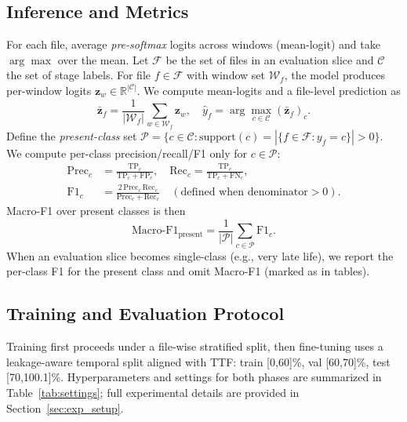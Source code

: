 \documentclass[pdflatex,sn-mathphys-num]{sn-jnl}%
\begin{document}
\subsection{Inference and Metrics}
\label{sec:filewise}\label{sec:present}
For each file, average \emph{pre-softmax} logits across windows (mean-logit) and take $\arg\max$ over the mean. Let $\mathcal{F}$ be the set of files in an evaluation slice and $\mathcal{C}$ the set of stage labels. For file $f\in\mathcal{F}$ with window set $\mathcal{W}_f$, the model produces per-window logits $\mathbf{z}_w\in\mathbb{R}^{|\mathcal{C}|}$. We compute mean-logits and a file-level prediction as
\begin{equation*}
\bar{\mathbf{z}}_f = \frac{1}{|\mathcal{W}_f|}\sum_{w\in\mathcal{W}_f} \mathbf{z}_w,\quad \hat{y}_f = \arg\max_{c\in\mathcal{C}} (\bar{\mathbf{z}}_f)_c.
\end{equation*}
Define the \emph{present-class} set $\mathcal{P} = \{ c\in\mathcal{C} : \text{support}(c) = |\{ f\in\mathcal{F} : y_f = c \}| > 0 \}$. We compute per-class precision/recall/F1 only for $c\in\mathcal{P}$:
\begin{align*}
\mathrm{Prec}_c &= \frac{\mathrm{TP}_c}{\mathrm{TP}_c + \mathrm{FP}_c},\quad
\mathrm{Rec}_c = \frac{\mathrm{TP}_c}{\mathrm{TP}_c + \mathrm{FN}_c},\\
\mathrm{F1}_c &= \frac{2\,\mathrm{Prec}_c\,\mathrm{Rec}_c}{\mathrm{Prec}_c + \mathrm{Rec}_c} \quad (\text{defined when denominator} > 0).
\end{align*}
Macro-F1 over present classes is then
\begin{equation*}
\mathrm{Macro\text{-}F1}_{\text{present}} = \frac{1}{|\mathcal{P}|}\sum_{c\in\mathcal{P}} \mathrm{F1}_c.
\end{equation*}
When an evaluation slice becomes single-class (e.g., very late life), we report the per-class F1 for the present class and omit Macro-F1 (marked as \textemdash{} in tables).

\subsection{Training and Evaluation Protocol}
Training first proceeds under a file-wise stratified split, then fine-tuning uses a leakage-aware temporal split aligned with TTF: train [0,60]\%, val [60,70]\%, test [70,100.1]\%. Hyperparameters and settings for both phases are summarized in Table~\ref{tab:settings}; full experimental details are provided in Section~\ref{sec:exp_setup}.
\end{document}
